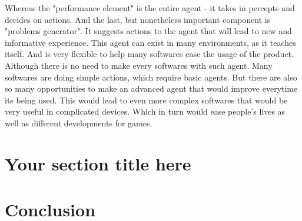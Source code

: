 \documentclass{scrartcl}
\begin{document}
Whereas the "performance element" is the entire agent - it takes in percepts and decides on actions.
And the last, but nonetheless important component is "problems generator".
It suggests actions to the agent that will lead to new and informative experience. %
This agent can exist in many environments, as it teaches itself.
And is very flexible to help many softwares ease the usage of the product.
Although there is no need to make every softwares with such agent.
Many softwares are doing simple actions, which require basic agents.
But there are also so many opportunities to make an advanced agent that would improve everytime its being used.
This would lead to even more complex softwares that would be very useful in complicated devices.
Which in turn would ease people's lives as well as different developments for games. %

\section{Your section title here}


\section{Conclusion}




\end{document}
